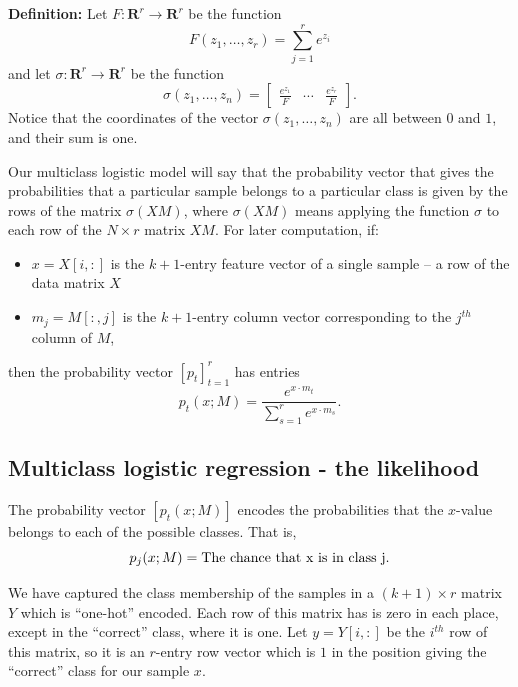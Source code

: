 \documentclass[
  11pt,
  letterpaper,
]{scrbook}
\providecommand{\tightlist}{%
  \setlength{\itemsep}{0pt}\setlength{\parskip}{0pt}}\usepackage{longtable,booktabs,array}
\theoremstyle{plain}
\theoremstyle{plain}
\theoremstyle{remark}
\begin{document}
\textbf{Definition:} Let \(F:\mathbf{R}^r\to\mathbf{R}^{r}\) be the
function \[
F(z_1,\ldots, z_r) = \sum_{j=1}^{r} e^{z_{i}}
\] and let \(\sigma:\mathbf{R}^{r}\to \mathbf{R}^{r}\) be the function
\[
\sigma(z_1,\ldots, z_n) = \left[\begin{matrix} \frac{e^{z_1}}{F} & \cdots & \frac{e^{z_{r}}}{F}\end{matrix}\right].
\] Notice that the coordinates of the vector \(\sigma(z_1,\ldots,z_n)\)
are all between \(0\) and \(1\), and their sum is one.

Our multiclass logistic model will say that the probability vector that
gives the probabilities that a particular sample belongs to a particular
class is given by the rows of the matrix \(\sigma(XM)\), where
\(\sigma(XM)\) means applying the function \(\sigma\) to each row of the
\(N\times r\) matrix \(XM\). For later computation, if:

\begin{itemize}
\tightlist
\item
  \(x=X[i,:]\) is the \(k+1\)-entry feature vector of a single sample --
  a row of the data matrix \(X\)
\item
  \(m_{j}=M[:,j]\) is the \(k+1\)-entry column vector corresponding to
  the \(j^{th}\) column of \(M\),
\end{itemize}

then the probability vector \([p_{t}]_{t=1}^{r}\) has entries \[
p_{t}(x;M) = \frac{e^{x\cdot m_{t}}}{\sum_{s=1}^{r} e^{x\cdot m_{s} }}.
\]

\hypertarget{multiclass-logistic-regression---the-likelihood}{%
\subsection{Multiclass logistic regression - the
likelihood}\label{multiclass-logistic-regression---the-likelihood}}

The probability vector \([p_{t}(x;M)]\) encodes the probabilities that
the \(x\)-value belongs to each of the possible classes. That is, \[
p_{j}(x;M)=\hbox{The chance that x is in class j}.
\]

We have captured the class membership of the samples in a
\((k+1)\times r\) matrix \(Y\) which is ``one-hot'' encoded. Each row of
this matrix has is zero in each place, except in the ``correct'' class,
where it is one. Let \(y=Y[i,:]\) be the \(i^{th}\) row of this matrix,
so it is an \(r\)-entry row vector which is \(1\) in the position giving
the ``correct'' class for our sample \(x\).
\end{document}

